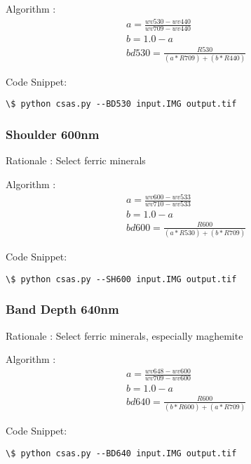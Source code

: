 \documentclass[letterpaper,10pt,english]{sphinxmanual}
\begin{document}
Algorithm : $$\begin{aligned}
& a = \frac{wv530 - wv440}{wv709 - wv440} \nonumber\\
& b = 1.0 - a \nonumber\\
& bd530 = \frac{R530}{(a*R709)+(b*R440)}
\end{aligned}$$

Code Snippet:

\begin{Verbatim}[commandchars=\\\{\}]
\$ python csas.py --BD530 input.IMG output.tif
\end{Verbatim}


\subsubsection{Shoulder 600nm}
\label{Algorithms:shoulder-600nm}
Rationale : Select ferric minerals

Algorithm : $$\begin{aligned}
& a = \frac{wv600 - wv533}{wv710 - wv533} \nonumber\\
& b = 1.0 - a \nonumber\\
& bd600 = \frac{R600}{(a*R530)+(b*R709)}
\end{aligned}$$

Code Snippet:

\begin{Verbatim}[commandchars=\\\{\}]
\$ python csas.py --SH600 input.IMG output.tif
\end{Verbatim}


\subsubsection{Band Depth 640nm}
\label{Algorithms:band-depth-640nm}
Rationale : Select ferric minerals, especially maghemite

Algorithm : $$\begin{aligned}
& a = \frac{wv648 - wv600}{wv709 - wv600} \nonumber\\
& b = 1.0 - a \nonumber\\
& bd640 = \frac{R600}{(b*R600)+(a*R709)}
\end{aligned}$$

Code Snippet:

\begin{Verbatim}[commandchars=\\\{\}]
\$ python csas.py --BD640 input.IMG output.tif
\end{Verbatim}
\end{document}
